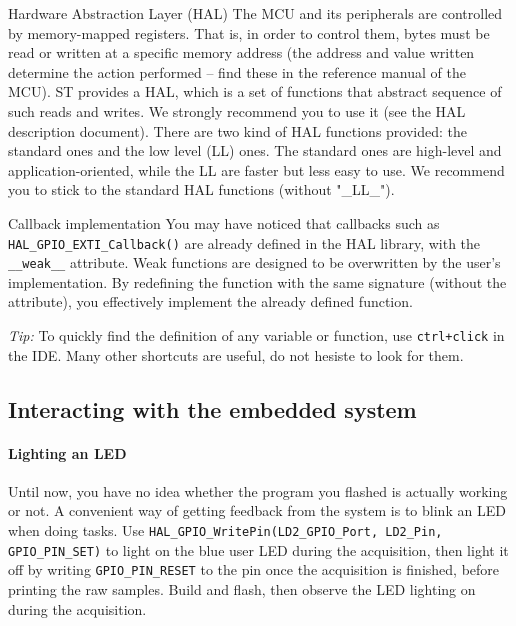 \begin{bclogo}[couleur = gray!20, arrondi = 0.2, logo=\bcinfo]{Hardware Abstraction Layer (HAL)}
The MCU and its peripherals are controlled by memory-mapped registers. That is, in order to control them, bytes must be read or written at a specific memory address (the address and value written determine the action performed -- find these in the reference manual of the MCU).
ST provides a HAL, which is a set of functions that abstract sequence of such reads and writes. We strongly recommend you to use it (see the HAL description document). There are two kind of HAL functions provided: the standard ones and the low level (LL) ones. The standard ones are high-level and application-oriented, while the LL are faster but less easy to use. We recommend you to stick to the standard HAL functions (without "\_LL\_").
\end{bclogo}

\begin{bclogo}[couleur = gray!20, arrondi = 0.2, logo=\bcinfo]{Callback implementation}
You may have noticed that callbacks such as \texttt{HAL\_GPIO\_EXTI\_Callback()} are already defined in the HAL library, with the \texttt{\_\_weak\_\_} attribute. Weak functions are designed to be overwritten by the user's implementation. By redefining the function with the same signature (without the attribute), you effectively implement the already defined function.

\textit{Tip:} To quickly find the definition of any variable or function, use \texttt{ctrl+click} in the IDE. Many other shortcuts are useful, do not hesiste to look for them.
\end{bclogo}

\subsection{Interacting with the embedded system}

\paragraph{Lighting an LED}
Until now, you have no idea whether the program you flashed is actually working or not. A convenient way of getting feedback from the system is to blink an LED when doing tasks. Use \texttt{HAL\_GPIO\_WritePin(LD2\_GPIO\_Port, LD2\_Pin, GPIO\_PIN\_SET)} to light on the blue user LED during the acquisition, then light it off by writing \texttt{GPIO\_PIN\_RESET} to the pin once the acquisition is finished, before printing the raw samples. Build and flash, then observe the LED lighting on during the acquisition.

